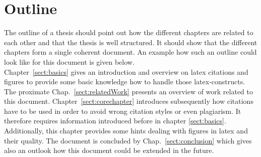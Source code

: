 \section{Outline}


The outline of a thesis should point out how the different chapters are related to each other and that the thesis is well structured.
It should show that the different chapters form a single coherent document.
An example how such an outline could look like for this document is given below.\\

Chapter~\ref{sect:basics} gives an introduction and overview on latex citations and figures to provide some basic knowledge how to handle those latex-constructs.
The proximate Chap.~\ref{sect:relatedWork} presents an overview of work related to this document.
Chapter~\ref{sect:corechapter} introduces subsequently how citations have to be used in order to avoid wrong citation styles or even plagiarism.
It therefore requires information introduced before in chapter \ref{sect:basics}.
Additionally, this chapter provides some hints dealing with figures in latex and their quality.
The document is concluded by Chap.~\ref{sect:conclusion} which gives also an outlook how this document could be extended in the future.
